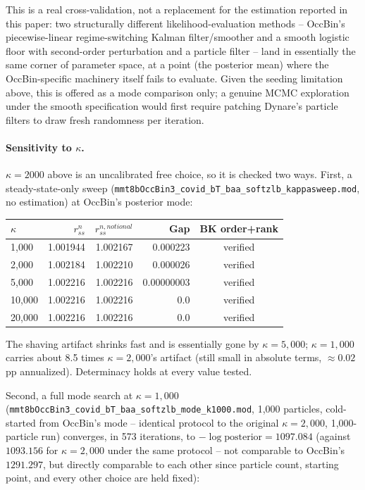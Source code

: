 \documentclass[11pt]{article}
\begin{document}
This is a real cross-validation, not a replacement for the estimation
reported in this paper: two structurally different
likelihood-evaluation methods -- OccBin's piecewise-linear
regime-switching Kalman filter/smoother and a smooth logistic floor with
second-order perturbation and a particle filter -- land in essentially
the same corner of parameter space, at a point (the posterior mean) where
the OccBin-specific machinery itself fails to evaluate. Given the seeding
limitation above, this is offered as a mode comparison only; a genuine
MCMC exploration under the smooth specification would first require
patching Dynare's particle filters to draw fresh randomness per
iteration.

\paragraph{Sensitivity to $\kappa$.} $\kappa=2000$ above is an uncalibrated
free choice, so it is checked two ways. First, a steady-state-only sweep
(\texttt{mmt8bOccBin3\_covid\_bT\_baa\_softzlb\_kappasweep.mod}, no
estimation) at OccBin's posterior mode:

\begin{center}
\begin{tabular}{@{}lrrrc@{}}
\toprule
$\kappa$ & $r^n_{ss}$ & $r^{n,notional}_{ss}$ & Gap & BK order+rank \\
\midrule
1{,}000  & 1.001944 & 1.002167 & 0.000223 & verified \\
2{,}000  & 1.002184 & 1.002210 & 0.000026 & verified \\
5{,}000  & 1.002216 & 1.002216 & 0.00000003 & verified \\
10{,}000 & 1.002216 & 1.002216 & 0.0 & verified \\
20{,}000 & 1.002216 & 1.002216 & 0.0 & verified \\
\bottomrule
\end{tabular}
\end{center}

The shaving artifact shrinks fast and is essentially gone by
$\kappa=5{,}000$; $\kappa=1{,}000$ carries about 8.5 times $\kappa=2{,}000$'s
artifact (still small in absolute terms, $\approx0.02$pp annualized).
Determinacy holds at every value tested.

Second, a full mode search at $\kappa=1{,}000$
(\texttt{mmt8bOccBin3\_covid\_bT\_baa\_softzlb\_mode\_k1000.mod}, 1{,}000
particles, cold-started from OccBin's mode -- identical protocol to the
original $\kappa=2{,}000$, 1{,}000-particle run) converges, in 573
iterations, to $-\log\text{posterior}=1097.084$ (against $1093.156$ for
$\kappa=2{,}000$ under the same protocol -- not comparable to OccBin's
$1291.297$, but directly comparable to each other since particle count,
starting point, and every other choice are held fixed):
\end{document}
